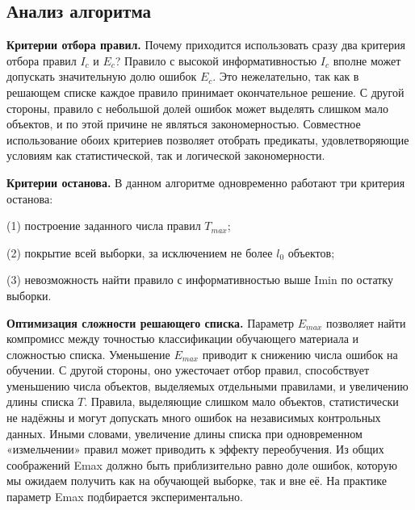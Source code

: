 \subsection{Анализ алгоритма}

\textbf{Критерии отбора правил.} Почему приходится использовать сразу два критерия
отбора правил $I_c$ и $E_c$? Правило с высокой информативностью $I_c$ вполне может допускать значительную долю ошибок $E_c$. Это нежелательно, так как в решающем списке каждое правило принимает окончательное решение. С другой стороны, правило с небольшой долей ошибок может выделять слишком мало объектов,
и по этой причине не являться закономерностью. Совместное использование обоих
критериев позволяет отобрать предикаты, удовлетворяющие условиям как статистической, так и логической закономерности.

\textbf{Критерии останова.} В данном алгоритме одновременно работают три критерия останова: 

(1) построение заданного числа правил $T_{max}$; 

(2) покрытие всей выборки, за исключением не более $l_0$ объектов; 

(3) невозможность найти правило с информативностью выше Imin по остатку выборки.

\textbf{Оптимизация сложности решающего списка.} Параметр $E_{max}$ позволяет найти
компромисс между точностью классификации обучающего материала и сложностью
списка. Уменьшение $E_{max}$ приводит к снижению числа ошибок на обучении. С другой
стороны, оно ужесточает отбор правил, способствует уменьшению числа объектов,
выделяемых отдельными правилами, и увеличению длины списка $T$. Правила, выделяющие слишком мало объектов, статистически не надёжны и могут допускать много
ошибок на независимых контрольных данных. Иными словами, увеличение длины
списка при одновременном «измельчении» правил может приводить к эффекту переобучения. Из общих соображений Emax должно быть приблизительно равно доле
ошибок, которую мы ожидаем получить как на обучающей выборке, так и вне её.
На практике параметр Emax подбирается экспериментально.

